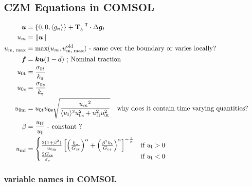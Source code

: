 \documentclass[../main.tex]{subfiles}
\begin{document}
\subsection{CZM Equations in COMSOL}
\begin{align}
\bm{u} &= \{0, 0, \langle g_n \rangle \} + \mathbf{T}_b^{-{\sf {T}}} \cdot \Delta \bm{g}_t\\
u_m &= \|\bm{u}\|\\
u_{\text{m, max}} &= \text{max}(u_m, u_{\text{m, max}}^{\text{old}}) \text{ - same over the boundary or varies locally?}\\
\bm{f} &= \bm{k} \bm{u} (1-d) \text{ ; Nominal traction}\\
u_{\text{0t}} &= \frac{\sigma_{0t}}{k_{\rm{n}}} \\
u_{\text{0s}} &= \frac{\sigma_{0s}}{k_{\rm{t}}}\\
u_{\text{0m}} &= u_{\text{0t}} u_{\text{0s}} \sqrt{\frac{{u_m}^2}{\langle u_{\rm{I}} \rangle^2 u_{\text{0s}}^2 + u_{\rm{II}}^2 u_{\text{0t}}^2 }} \text{ - why does it contain time varying quantities?}\\
\beta &= \frac{u_{\rm{II}}}{u_{\rm{I}}} \text{ - constant ?}\\
u_{\text {mf}} &=
    \begin{cases}
        \frac{2(1+\beta^2)}{u_{\text{0m}}}\left[ \left(  \frac{k_n}{G_{ct}} \right)^\alpha + \left(\frac{\beta^2 k_t}{G_{cs}} \right)^\alpha \right]^{-\frac{1}{\alpha}} & \text{if } u_{\rm{I}} > 0 \\
        \frac{2G_{\rm{cs}}}{\sigma_s}& \text{if } u_{\rm{I}} < 0 
    \end{cases}\\
\end{align}
\subsubsection{variable names in COMSOL}
\end{document}
